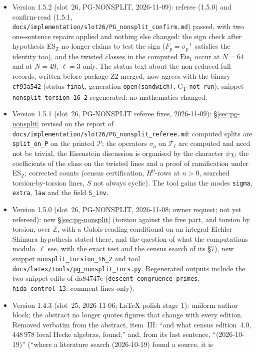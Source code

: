 \documentclass[11pt]{article}
\newcommand{\Z}{\mathbb{Z}}
\newcommand{\code}[1]{\texttt{#1}}
\newcommand{\file}[1]{\texttt{#1}}
\begin{document}
\begin{itemize}[leftmargin=1.6em,itemsep=2pt]
\item Version 1.5.2 (slot~26, PG-NONSPLIT, 2026-11-09): referee (1.5.0) and confirm-read (1.5.1, \file{docs/implementation/slot26/PG\_nonsplit\_confirm.md}) passed, with two one-sentence repairs applied and nothing else changed: the sign check after hypothesis ES$_\Z$ no longer claims to test the sign ($F_p=\sigma_p^{-1}$ satisfies the identity too), and the twisted classes in the computed $\mathrm{Eis}_1$ occur at $N=64$ and at $N=49$, $\ell=3$ only. The status text about the non-reduced full records, written before package Z2 merged, now agrees with the binary \code{cf93a542} (status \code{final}, generation \code{open(sandwich)}, C\textsubscript{T} \code{not\_run}); snippet \file{nonsplit\_torsion\_16\_2} regenerated; no mathematics changed.\par\item Version 1.5.1 (slot~26, PG-NONSPLIT referee fixes, 2026-11-09): \S\ref{sec:pg-nonsplit} revised on the report of \file{docs/implementation/slot26/PG\_nonsplit\_referee.md}: computed splits are \code{split\_on\_P} on the printed $\mathcal P$; the operators $\sigma_a$ on $\mathcal T_\ell$ are computed and need not be trivial, the Eisenstein discussion is organised by the character $\psi\chi$; the coefficients of the class on the twisted lines and a proof of ramification under ES$_\Z$; corrected counts (census certification, $H^{0}$-rows at $n>0$, searched torsion-by-torsion lines, $S$ not always cyclic). The tool gains the modes \code{sigma}, \code{extra}, \code{law} and the field \code{S\_inv}.\par\item Version 1.5.0 (slot~26, PG-NONSPLIT, 2026-11-08; owner request; not yet refereed): new \S\ref{sec:pg-nonsplit} (torsion against the free part, and torsion by torsion, over $\Z$, with a Galois reading conditional on an integral Eichler--Shimura hypothesis stated there, and the question of what the computations modulo~$\ell$ see, with the exact test and the census search of its \S7), new snippet \file{nonsplit\_torsion\_16\_2} and tool \file{docs/latex/tools/pg\_nonsplit\_tors.py}. Regenerated outputs include the two snippet edits of da84747c (\file{descent\_congruence\_primes}, \file{hida\_control\_13}: comment lines only).
\item Version 1.4.3 (slot~25, 2026-11-06; LaTeX polish stage 1): uniform author block; the abstract no longer quotes figures that change with every edition. Removed
  verbatim from the abstract, item~III: ``and what census edition~4.0,
  $448\,978$ local Hecke algebras, found;'' and, from its last sentence, ``(2026-10-19)'' (``where a literature search (2026-10-19) found a source, it is

\end{itemize}
\end{document}
